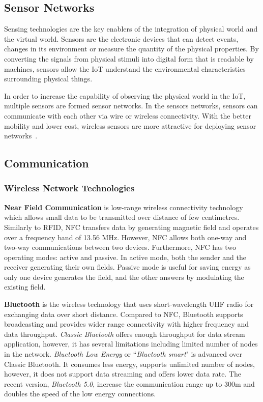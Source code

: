 \subsection{Sensor Networks}

Sensing technologies are the key enablers of the integration of physical world and the virtual world.
Sensors are the electronic devices that can detect events, changes in its environment or measure the quantity of the physical properties.
By converting the signals from physical stimuli into digital form that is readable by machines, sensors allow the IoT understand the environmental characteristics surrounding physical things.

In order to increase the capability of observing the physical world in the IoT, multiple sensors are formed sensor networks.
In the sensors networks, sensors can communicate with each other via wire or wireless connectivity. 
With the better mobility and lower cost, wireless sensors are more attractive for deploying sensor networks~\citep{Sheng:2015}.


\subsection{Communication}

\subsubsection{Wireless Network Technologies}


\textbf{Near Field Communication} is low-range wireless connectivity technology which allows small data to be transmitted over distance of few centimetres. 
Similarly to RFID, NFC transfers data by generating magnetic field and operates over a frequency band of 13.56 MHz.
However, NFC allows both one-way and two-way communications between two devices.
Furthermore, NFC has two operating modes: active and passive.
In active mode, both the sender and the receiver  generating their own fields.
Passive mode is useful for saving energy as only one device generates the field, and the other answers by modulating the existing field.

\textbf{Bluetooth} is the wireless technology that uses short-wavelength UHF radio for exchanging data over short distance.
Compared to NFC, Bluetooth supports broadcasting and provides wider range connectivity with higher frequency and data throughput. 
\textit{Classic Bluetooth} offers enough throughput for data stream application, however, it has several limitations including limited number of nodes in the network.
\textit{Bluetooth Low Energy} or ``\textit{Bluetooth smart}" is advanced over Classic Bluetooth.
It consumes less energy, supports unlimited number of nodes, however, it does not support data streaming and offers lower data rate.
The recent version, \textit{Bluetooth 5.0}, increase the communication range up to 300m and doubles the speed of the low energy connections. 

